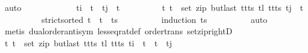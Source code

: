 \begin{isabellebody}
\ auto\isanewline
\ \ \ \ \isamarkupfalse%
\isanewline
\ \ \ \ \ \ \isamarkupfalse%
\ {\isachardoublequoteopen}t\isactrlsub i\ {\isasymle}\ t\ {\isasymand}\ t\isactrlsub j\ {\isacharless}{\kern0pt}\ t{\isacharprime}{\kern0pt}{\isachardoublequoteclose}\isanewline
\ \ \ \ \ \ \isamarkupfalse%
\ \isamarkupfalse%
\ {\isachardoublequoteopen}{\isasymforall}{\isacharparenleft}{\kern0pt}t{\isacharcomma}{\kern0pt}\ t{\isacharprime}{\kern0pt}{\isacharparenright}{\kern0pt}\ {\isasymin}\ set\ {\isacharparenleft}{\kern0pt}zip\ {\isacharparenleft}{\kern0pt}butlast\ {\isacharparenleft}{\kern0pt}t{\isacharhash}{\kern0pt}t{\isacharprime}{\kern0pt}{\isacharhash}{\kern0pt}ts{\isacharparenright}{\kern0pt}{\isacharparenright}{\kern0pt}\ {\isacharparenleft}{\kern0pt}tl\ {\isacharparenleft}{\kern0pt}t{\isacharhash}{\kern0pt}t{\isacharprime}{\kern0pt}{\isacharhash}{\kern0pt}ts{\isacharparenright}{\kern0pt}{\isacharparenright}{\kern0pt}{\isacharparenright}{\kern0pt}{\isachardot}{\kern0pt}\ t\isactrlsub j\ {\isacharless}{\kern0pt}\ t{\isacharprime}{\kern0pt}{\isachardoublequoteclose}\isanewline
\ \ \ \ \ \ \ \ \isamarkupfalse%
\ {\isacartoucheopen}strict{\isacharunderscore}{\kern0pt}sorted\ {\isacharparenleft}{\kern0pt}t\ {\isacharhash}{\kern0pt}\ t{\isacharprime}{\kern0pt}\ {\isacharhash}{\kern0pt}\ ts{\isacharparenright}{\kern0pt}{\isacartoucheclose}\isanewline
\ \ \ \ \ \ \ \ \isamarkupfalse%
\ {\isacharparenleft}{\kern0pt}induction\ ts{\isacharparenright}{\kern0pt}\isanewline
\ \ \ \ \ \ \ \ \isamarkupfalse%
\ auto\isanewline
\ \ \ \ \ \ \ \ \isamarkupfalse%
\ {\isacharparenleft}{\kern0pt}metis\ dual{\isacharunderscore}{\kern0pt}order{\isachardot}{\kern0pt}antisym\ less{\isacharunderscore}{\kern0pt}eq{\isacharunderscore}{\kern0pt}rat{\isacharunderscore}{\kern0pt}def\ order{\isacharunderscore}{\kern0pt}trans\ set{\isacharunderscore}{\kern0pt}zip{\isacharunderscore}{\kern0pt}rightD{\isacharparenright}{\kern0pt}\isanewline
\ \ \ \ \ \ \ \ \isamarkupfalse%
\isanewline
\ \ \ \ \ \ \isamarkupfalse%
\ \isamarkupfalse%
\ {\isachardoublequoteopen}{\isasymnot}{\isacharparenleft}{\kern0pt}{\isasymexists}{\isacharparenleft}{\kern0pt}t{\isacharcomma}{\kern0pt}\ t{\isacharprime}{\kern0pt}{\isacharparenright}{\kern0pt}\ {\isasymin}\ set\ {\isacharparenleft}{\kern0pt}zip\ {\isacharparenleft}{\kern0pt}butlast\ {\isacharparenleft}{\kern0pt}t{\isacharhash}{\kern0pt}t{\isacharprime}{\kern0pt}{\isacharhash}{\kern0pt}ts{\isacharparenright}{\kern0pt}{\isacharparenright}{\kern0pt}\ {\isacharparenleft}{\kern0pt}tl\ {\isacharparenleft}{\kern0pt}t{\isacharhash}{\kern0pt}t{\isacharprime}{\kern0pt}{\isacharhash}{\kern0pt}ts{\isacharparenright}{\kern0pt}{\isacharparenright}{\kern0pt}{\isacharparenright}{\kern0pt}{\isachardot}{\kern0pt}\ t\isactrlsub i\ {\isasymle}\ t\ {\isasymand}\ t{\isacharprime}{\kern0pt}\ {\isasymle}\ t\isactrlsub j{\isacharparenright}{\kern0pt}{\isachardoublequoteclose}\isanewline

\end{isabellebody}
